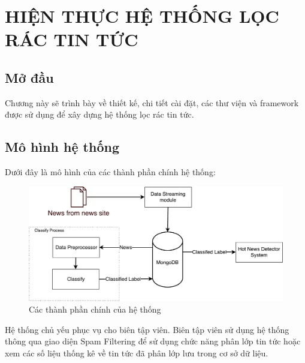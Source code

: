 \chapter{HIỆN THỰC HỆ THỐNG LỌC RÁC TIN TỨC}
\ifpdf
    \graphicspath{{Chapter3/Chapter3Figs/PNG/}{Chapter3/Chapter3Figs/PDF/}{Chapter3/Chapter3Figs/}}
\else
    \graphicspath{{Chapter3/Chapter3Figs/EPS/}{Chapter3/Chapter3Figs/}}
\fi

\section{Mở đầu}
Chương này sẽ trình bày về thiết kế, chi tiết cài đặt, các thư viện và framework được sử dụng để xây dựng hệ thống lọc rác tin tức.

\section{Mô hình hệ thống}
Dưới đây là mô hình của các thành phần chính hệ thống:
\begin{figure}[H]
	\centering
	\includegraphics[width=0.9\linewidth]{Chapter3/Chapter3Figs/PDF/SystemArchitecture}
	\caption{Các thành phần chính của hệ thống}
	\label{fig:systemarchitecture}
\end{figure}

Hệ thống chủ yếu phục vụ cho biên tập viên. Biên tập viên sử dụng hệ thống thông qua giao diện Spam Filtering để sử dụng chức năng phân lớp tin tức hoặc xem các số liệu thống kê về tin tức đã phân lớp lưu trong cơ sở dữ liệu.

